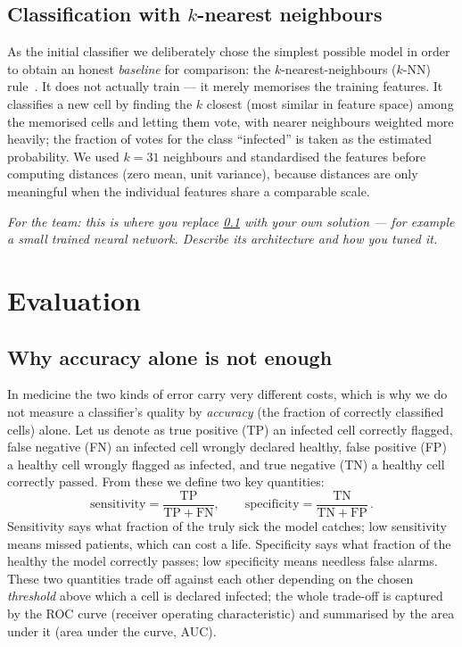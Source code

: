 \documentclass[11pt]{article}
\newcommand{\knnK}{31}
\begin{document}
\subsection{Classification with $k$-nearest neighbours}
\label{sec:knn}

As the initial classifier we deliberately chose the simplest possible model in order to obtain
an honest \emph{baseline} for comparison: the $k$-nearest-neighbours ($k$-NN)
rule~\cite{cover1967}. It does not actually train --- it merely memorises the training features.
It classifies a new cell by finding the $k$ closest (most similar in feature space) among the
memorised cells and letting them vote, with nearer neighbours weighted more heavily; the
fraction of votes for the class ``infected'' is taken as the estimated probability. We used
$k=\knnK{}$ neighbours and standardised the features before computing distances (zero mean, unit
variance), because distances are only meaningful when the individual features share a comparable
scale.

\medskip\noindent\textit{For the team: this is where you replace \cref{sec:knn} with your own
solution --- for example a small trained neural network. Describe its architecture and how you
tuned it.}

\section{Evaluation}
\label{sec:eval}

\subsection{Why accuracy alone is not enough}
\label{sec:metrics}

In medicine the two kinds of error carry very different costs, which is why we do not measure a
classifier's quality by \emph{accuracy} (the fraction of correctly classified cells) alone. Let
us denote as true positive (TP) an infected cell correctly flagged, false negative (FN) an
infected cell wrongly declared healthy, false positive (FP) a healthy cell wrongly flagged as
infected, and true negative (TN) a healthy cell correctly passed. From these we define two key
quantities:
%
\begin{equation}
\mathrm{sensitivity} = \frac{\mathrm{TP}}{\mathrm{TP}+\mathrm{FN}}, \qquad
\mathrm{specificity} = \frac{\mathrm{TN}}{\mathrm{TN}+\mathrm{FP}}\,.
\label{eq:senspec}
\end{equation}
%
Sensitivity says what fraction of the truly sick the model catches; low sensitivity means missed
patients, which can cost a life. Specificity says what fraction of the healthy the model
correctly passes; low specificity means needless false alarms. These two quantities trade off
against each other depending on the chosen \emph{threshold} above which a cell is declared
infected; the whole trade-off is captured by the ROC curve (receiver operating characteristic)
and summarised by the area under it (area under the curve, AUC).
\end{document}
